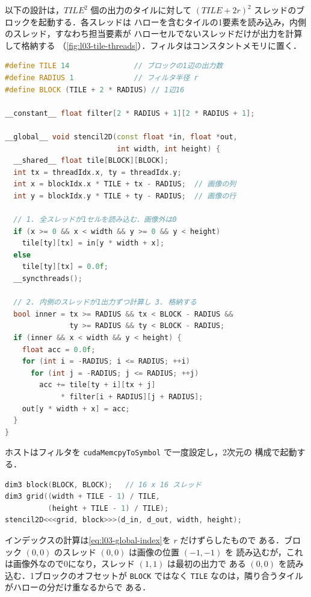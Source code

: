 \documentclass[../main.tex]{subfiles}
\begin{document}
以下の設計は，$\mathit{TILE}^2$ 個の出力のタイルに対して
$(\mathit{TILE}+2r)^2$ スレッドのブロックを起動する．各スレッドは
ハローを含むタイルの1要素を読み込み，内側のスレッド，すなわち担当要素が
ハローセルでないスレッドだけが出力を計算して格納する
（\cref{fig:l03-tile-threads}）．フィルタはコンスタントメモリに置く．

\begin{lstlisting}[language=C++, numbers=none]
#define TILE 14               // ブロックの1辺の出力数
#define RADIUS 1              // フィルタ半径 r
#define BLOCK (TILE + 2 * RADIUS) // 1辺16

__constant__ float filter[2 * RADIUS + 1][2 * RADIUS + 1];

__global__ void stencil2D(const float *in, float *out,
                          int width, int height) {
  __shared__ float tile[BLOCK][BLOCK];
  int tx = threadIdx.x, ty = threadIdx.y;
  int x = blockIdx.x * TILE + tx - RADIUS;  // 画像の列
  int y = blockIdx.y * TILE + ty - RADIUS;  // 画像の行

  // 1. 全スレッドが1セルを読み込む．画像外は0
  if (x >= 0 && x < width && y >= 0 && y < height)
    tile[ty][tx] = in[y * width + x];
  else
    tile[ty][tx] = 0.0f;
  __syncthreads();

  // 2. 内側のスレッドが1出力ずつ計算し 3. 格納する
  bool inner = tx >= RADIUS && tx < BLOCK - RADIUS &&
               ty >= RADIUS && ty < BLOCK - RADIUS;
  if (inner && x < width && y < height) {
    float acc = 0.0f;
    for (int i = -RADIUS; i <= RADIUS; ++i)
      for (int j = -RADIUS; j <= RADIUS; ++j)
        acc += tile[ty + i][tx + j]
             * filter[i + RADIUS][j + RADIUS];
    out[y * width + x] = acc;
  }
}
\end{lstlisting}
ホストはフィルタを \texttt{cudaMemcpyToSymbol} で一度設定し，2次元の
構成で起動する．
\begin{lstlisting}[language=C++, numbers=none]
dim3 block(BLOCK, BLOCK);   // 16 x 16 スレッド
dim3 grid((width + TILE - 1) / TILE,
          (height + TILE - 1) / TILE);
stencil2D<<<grid, block>>>(d_in, d_out, width, height);
\end{lstlisting}
インデックスの計算は\cref{eq:l03-global-index}を $r$ だけずらしたもので
ある．ブロック $(0,0)$ のスレッド $(0,0)$ は画像の位置 $(-1,-1)$ を
読み込むが，これは画像外なので0になり，スレッド $(1,1)$ は最初の出力で
ある $(0,0)$ を読み込む．1ブロックのオフセットが \texttt{BLOCK} ではなく
\texttt{TILE} なのは，隣り合うタイルがハローの分だけ重なるからで
ある．
\end{document}

